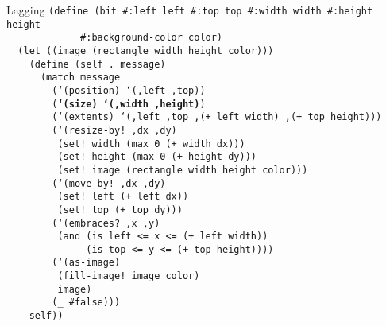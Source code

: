 \begin{frame}{Lagging}
  \tiny
  \texttt{(define (bit \#:left left \#:top top \#:width width \#:height height\\
    \ \ \ \ \ \ \ \ \ \ \ \ \ \#:background-color color)\\
    \ \ (let ((image (rectangle width height color)))\\
    \ \ \ \ (define (self .\ message)\\
    \ \ \ \ \ \ (match message\\
    \ \ \ \ \ \ \ \ (`(position) `(,left ,top))\\
    \ \ \ \ \ \ \ \ (\textbf{`(size) `(,width ,height)})\\
    \ \ \ \ \ \ \ \ (`(extents) `(,left ,top ,(+ left width) ,(+ top height)))\\
    \ \ \ \ \ \ \ \ (`(resize-by!\ ,dx ,dy)\\
    \ \ \ \ \ \ \ \ \ (set!\ width (max 0 (+ width dx)))\\
    \ \ \ \ \ \ \ \ \ (set!\ height (max 0 (+ height dy)))\\
    \ \ \ \ \ \ \ \ \ (set!\ image (rectangle width height color)))\\
    \ \ \ \ \ \ \ \ (`(move-by!\ ,dx ,dy)\\
    \ \ \ \ \ \ \ \ \ (set!\ left (+ left dx))\\
    \ \ \ \ \ \ \ \ \ (set!\ top (+ top dy)))\\
    \ \ \ \ \ \ \ \ (`(embraces?\ ,x ,y)\\
    \ \ \ \ \ \ \ \ \ (and (is left <= x <= (+ left width))\\
    \ \ \ \ \ \ \ \ \ \ \ \ \ \ (is top <= y <= (+ top height))))\\
    \ \ \ \ \ \ \ \ (`(as-image)\\
    \ \ \ \ \ \ \ \ \ (fill-image!\ image color)\\
    \ \ \ \ \ \ \ \ \ image)\\
    \ \ \ \ \ \ \ \ (\_ \#false)))\\
    \ \ \ \ self))
  }
\end{frame}

